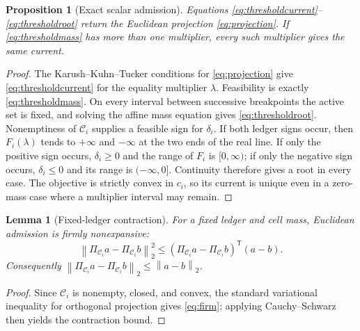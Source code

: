 \documentclass[journal]{IEEEtran}
\newtheorem{proposition}{Proposition}
\newtheorem{lemma}{Lemma}
\newcommand{\Ccal}{\mathcal{C}}
\newcommand{\norm}[1]{\left\lVert#1\right\rVert}
\begin{document}
\begin{proposition}[Exact scalar admission]
Equations \eqref{eq:thresholdcurrent}--\eqref{eq:thresholdroot} return the
Euclidean projection \eqref{eq:projection}. If \eqref{eq:thresholdmass} has
more than one multiplier, every such multiplier gives the same current.
\end{proposition}

\begin{proof}
The Karush--Kuhn--Tucker conditions for \eqref{eq:projection} give
\eqref{eq:thresholdcurrent} for the equality multiplier \(\lambda\).
Feasibility is exactly \eqref{eq:thresholdmass}. On every interval between
successive breakpoints the active set is fixed, and solving the affine mass
equation gives \eqref{eq:thresholdroot}. Nonemptiness of \(\Ccal_i\) supplies
a feasible sign for \(\delta_i\). If both ledger signs occur, then
\(F_i(\lambda)\) tends to \(+\infty\) and \(-\infty\) at the two ends of the
real line. If only the positive sign occurs, \(\delta_i\geq0\) and the range
of \(F_i\) is \([0,\infty)\); if only the negative sign occurs,
\(\delta_i\leq0\) and its range is \((-\infty,0]\). Continuity therefore
gives a root in every case. The objective is strictly convex in \(c_i\), so
its current is unique even in a zero-mass case where a multiplier interval
may remain.
\end{proof}

\begin{lemma}[Fixed-ledger contraction]
For a fixed ledger and cell mass, Euclidean admission is firmly
nonexpansive:
\begin{equation}
 \norm{\Pi_{\Ccal_i}a-\Pi_{\Ccal_i}b}_2^2
 \leq
 (\Pi_{\Ccal_i}a-\Pi_{\Ccal_i}b)^\mathsf T(a-b).
 \label{eq:firm}
\end{equation}
Consequently \(\norm{\Pi_{\Ccal_i}a-\Pi_{\Ccal_i}b}_2
\leq\norm{a-b}_2\).
\end{lemma}

\begin{proof}
Since \(\Ccal_i\) is nonempty, closed, and convex, the standard variational
inequality for orthogonal projection gives \eqref{eq:firm}; applying
Cauchy--Schwarz then yields the contraction bound.
\end{proof}
\end{document}

